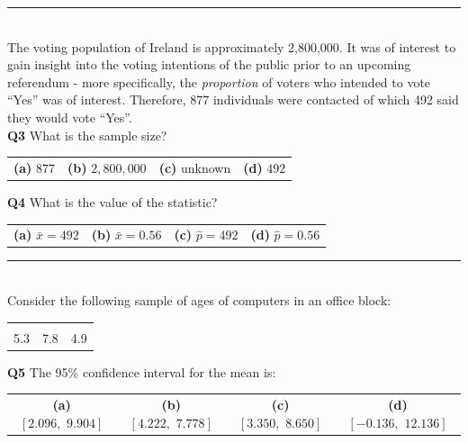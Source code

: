 \documentclass[12pt]{article}
\begin{document}
%


\rule{\linewidth}{1pt}
\quad\\
The voting population of Ireland is approximately 2,800,000. It was of interest to gain insight into the voting intentions of the public prior to an upcoming referendum - more specifically, the \emph{proportion} of voters who intended to vote ``Yes'' was of interest. Therefore, 877 individuals were contacted of which 492 said they would vote ``Yes''.
\\[0.2cm]


{\bf Q3} What is the sample size?\\[0.2cm]
\begin{tabular}{cccc}
{\bf(a)} $877$ & {\bf(b)} $2,800,000$ & {\bf(c)} unknown & {\bf(d)} $492$ \\[0.6cm]
\end{tabular}

{\bf Q4} What is the value of the statistic? \\[0.2cm]
\begin{tabular}{cccc}
{\bf(a)} $\bar x = 492$  & {\bf(b)} $\bar x = 0.56$ & {\bf(c)} $\hat p = 492$ & {\bf(d)} $\hat p = 0.56$ \\[0.6cm]
\end{tabular}


\rule{\linewidth}{1pt}

\quad\\
Consider the following sample of ages of computers in an office block:
\begin{center}
\begin{tabular}{|ccc|}
\hline
&&\\[-0.3cm]
5.3 & 7.8 & 4.9 \\[0.1cm]
\hline
\end{tabular}
\end{center}
{\bf Q5} The 95\% confidence interval for the mean is:\\[0.2cm]
\begin{tabular}{cccc}
{\bf(a)} $[2.096,\,\,9.904]$ & {\bf(b)} $[4.222,\,\,7.778]$ & {\bf(c)} $[3.350,\,\,8.650]$ & {\bf(d)} $[-0.136,\,\,12.136]$ \\[0.6cm]
\end{tabular}
\end{document}

